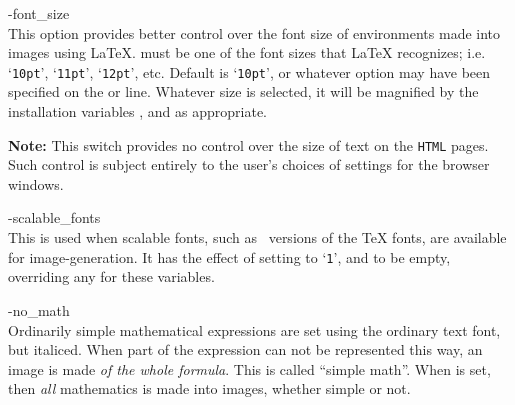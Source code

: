 \begin{htmllist}
\begin{changebar}
%
%

\item [ -font\_size \Meta{size}\label{fontsize}]
\\
This option provides better control 
over the font size of environments made into images using \LaTeX.  
 must be one of the font sizes that \LaTeX{} recognizes; 
i.e. `\texttt{10pt}', `\texttt{11pt}', `\texttt{12pt}', etc.  
Default is `\texttt{10pt}', or whatever option may have been specified on the 
 or  line.\html{\\}
Whatever size is selected, it will be magnified by the installation variables
, 
and  as appropriate.

\smallskip\noindent
\textbf{Note: }This switch provides no control over the size of text
on the \texttt{HTML} pages. 
Such control is subject entirely to the user's choices
of settings for the browser windows.
\end{changebar}%

%

\begin{changebar}
\item [ -scalable\_fonts\label{scalefonts}]
\\
This is used when scalable fonts, such as \PS\ versions
of the \TeX{} fonts, are available for image-generation.\html{\\}
It has the effect of setting  to `\texttt{1}',
and  to be empty, 
overriding any  for these variables.

%

\item [ -no\_math\label{nomath}]
\\
Ordinarily simple mathematical expressions are set using the ordinary text font, 
but italiced. When part of the expression can not be represented this way,
an image is made \emph{of the whole formula}. 
This is called ``simple math''.
When  is set, 
then \emph{all} mathematics is made into images, whether simple or not.


\end{changebar}
\end{htmllist}
